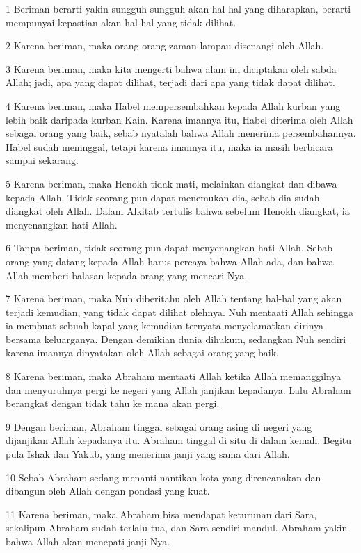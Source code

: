 \par 1 Beriman berarti yakin sungguh-sungguh akan hal-hal yang diharapkan, berarti mempunyai kepastian akan hal-hal yang tidak dilihat.
\par 2 Karena beriman, maka orang-orang zaman lampau disenangi oleh Allah.
\par 3 Karena beriman, maka kita mengerti bahwa alam ini diciptakan oleh sabda Allah; jadi, apa yang dapat dilihat, terjadi dari apa yang tidak dapat dilihat.
\par 4 Karena beriman, maka Habel mempersembahkan kepada Allah kurban yang lebih baik daripada kurban Kain. Karena imannya itu, Habel diterima oleh Allah sebagai orang yang baik, sebab nyatalah bahwa Allah menerima persembahannya. Habel sudah meninggal, tetapi karena imannya itu, maka ia masih berbicara sampai sekarang.
\par 5 Karena beriman, maka Henokh tidak mati, melainkan diangkat dan dibawa kepada Allah. Tidak seorang pun dapat menemukan dia, sebab dia sudah diangkat oleh Allah. Dalam Alkitab tertulis bahwa sebelum Henokh diangkat, ia menyenangkan hati Allah.
\par 6 Tanpa beriman, tidak seorang pun dapat menyenangkan hati Allah. Sebab orang yang datang kepada Allah harus percaya bahwa Allah ada, dan bahwa Allah memberi balasan kepada orang yang mencari-Nya.
\par 7 Karena beriman, maka Nuh diberitahu oleh Allah tentang hal-hal yang akan terjadi kemudian, yang tidak dapat dilihat olehnya. Nuh mentaati Allah sehingga ia membuat sebuah kapal yang kemudian ternyata menyelamatkan dirinya bersama keluarganya. Dengan demikian dunia dihukum, sedangkan Nuh sendiri karena imannya dinyatakan oleh Allah sebagai orang yang baik.
\par 8 Karena beriman, maka Abraham mentaati Allah ketika Allah memanggilnya dan menyuruhnya pergi ke negeri yang Allah janjikan kepadanya. Lalu Abraham berangkat dengan tidak tahu ke mana akan pergi.
\par 9 Dengan beriman, Abraham tinggal sebagai orang asing di negeri yang dijanjikan Allah kepadanya itu. Abraham tinggal di situ di dalam kemah. Begitu pula Ishak dan Yakub, yang menerima janji yang sama dari Allah.
\par 10 Sebab Abraham sedang menanti-nantikan kota yang direncanakan dan dibangun oleh Allah dengan pondasi yang kuat.
\par 11 Karena beriman, maka Abraham bisa mendapat keturunan dari Sara, sekalipun Abraham sudah terlalu tua, dan Sara sendiri mandul. Abraham yakin bahwa Allah akan menepati janji-Nya.
